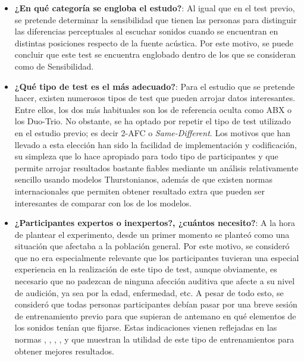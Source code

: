 \documentclass[11pt,a4paper,twoside]{book}
\begin{document}
            \begin{itemize}
                
                \item \textbf{¿En qué categoría se engloba el estudo?}: Al igual que en el test previo, se pretende determinar la sensibilidad que tienen las personas para distinguir las diferencias perceptuales al escuchar sonidos cuando se encuentran en distintas posiciones respecto de la fuente acústica. Por este motivo, se puede concluir que este test se encuentra englobado dentro de los que se consideran como de Sensibilidad.
                \item \textbf{¿Qué tipo de test es el más adecuado?}: Para el estudio que se pretende hacer, existen numerosos tipos de test que pueden arrojar datos interesantes. Entre ellos, los dos más habituales son los de referencia oculta como ABX o los Duo-Trio. No obstante, se ha optado por repetir el tipo de test utilizado en el estudio previo; es decir 2-AFC o \textit{Same-Different}. Los motivos que han llevado a esta elección han sido la facilidad de implementación y codificación, su simpleza que lo hace apropiado para todo tipo de participantes y que permite arrojar resultados bastante fiables mediante un análisis relativamente sencillo usando modelos Thurstonianos, además de que existen normas internacionales que permiten obtener resultado extra que pueden ser interesantes de comparar con los de los modelos.
                \item \textbf{¿Participantes expertos o inexpertos?, ¿cuántos necesito?}: A la hora de plantear el experimento, desde un primer momento se planteó como una situación que afectaba a la población general. Por este motivo, se consideró que no era especialmente relevante que los participantes tuvieran una especial experiencia en la realización de este tipo de test, aunque obviamente, es necesario que no padezcan de ninguna afección auditiva que afecte a su nivel de audición, ya sea por la edad, enfermedad, etc. A pesar de todo esto, se consideró que todas personas participantes debían pasar por una breve sesión de entrenamiento previo para que supieran de antemano en qué elementos de los sonidos tenían que fijarse. Estas indicaciones vienen reflejadas en las normas \cite{UIT1116}, \cite{UIT1534}, \cite{UIT1284}, \cite{EBU3286}, \cite{UIT1285} y \cite{UIT1286} que muestran la utilidad de este tipo de entrenamientos para obtener mejores resultados.
                

\end{itemize}
\end{document}
